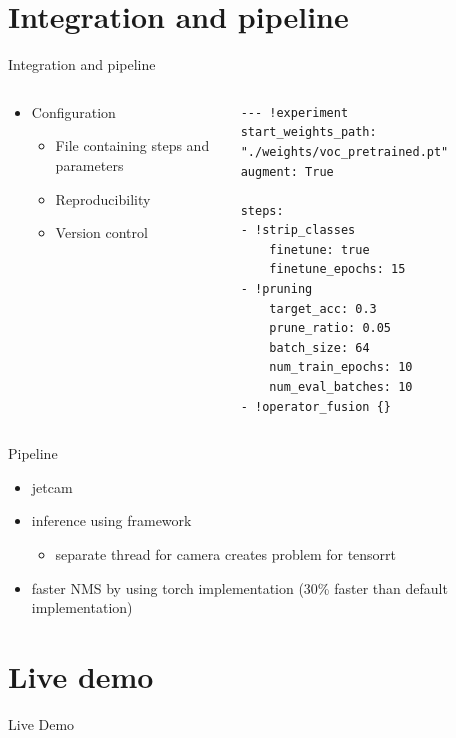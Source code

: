 \documentclass[en]{sdqbeamer}
\begin{document}
\section{Integration and pipeline}
\begin{frame}[fragile]{Integration and pipeline}
  \begin{columns}
    \begin{column}{0.5\textwidth}
      \begin{itemize}
      \item Configuration
        \begin{itemize}
        \item File containing steps and parameters
        \item Reproducibility
        \item Version control
        \end{itemize}
      \end{itemize}
    \end{column}

    \begin{column}{0.5\textwidth}
      \begin{lstlisting}
--- !experiment
start_weights_path: "./weights/voc_pretrained.pt"
augment: True

steps:
- !strip_classes
    finetune: true
    finetune_epochs: 15
- !pruning
    target_acc: 0.3
    prune_ratio: 0.05
    batch_size: 64
    num_train_epochs: 10
    num_eval_batches: 10
- !operator_fusion {}
      \end{lstlisting}
    \end{column}
  \end{columns}
\end{frame}

\begin{frame}{Pipeline}
  \begin{center}
    \begin{itemize}
      \item jetcam
      \item inference using framework
        \begin{itemize}
          \item separate thread for camera creates problem for tensorrt
        \end{itemize}
      \item faster NMS by using torch implementation (30\% faster than default implementation)
    \end{itemize}
  \end{center}
\end{frame}


\section{Live demo}
\begin{frame}
  \begin{center}
    \huge{Live Demo}
  \end{center}
\end{frame}
\end{document}
